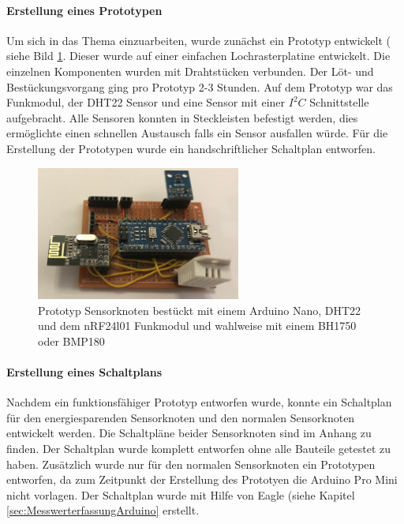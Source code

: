 \paragraph{Erstellung eines Prototypen} Um sich in das Thema einzuarbeiten, wurde zunächst ein Prototyp entwickelt ( siehe Bild \ref{img:prototyp}. Dieser wurde auf einer einfachen Lochrasterplatine entwickelt. Die einzelnen Komponenten wurden mit Drahtstücken verbunden. Der Löt- und Bestückungsvorgang ging pro Prototyp 2-3 Stunden. Auf dem Prototyp war das Funkmodul, der DHT22 Sensor und eine Sensor mit einer $I^2C$ Schnittstelle aufgebracht. Alle Sensoren konnten in Steckleisten befestigt werden, dies ermöglichte einen schnellen Austausch falls ein Sensor ausfallen würde. Für die Erstellung der Prototypen wurde ein handschriftlicher Schaltplan entworfen.
\begin{figure}
	\centering
	\includegraphics[width=0.6\textwidth]{bilder/prototyp}
	\caption[Prototyp Sensorknoten]{ Prototyp Sensorknoten bestückt mit einem Arduino Nano, DHT22 und dem nRF24l01 Funkmodul und wahlweise mit einem BH1750 oder BMP180}
	\label{img:prototyp}
\end{figure}

\paragraph{Erstellung eines Schaltplans} Nachdem ein funktionsfähiger Prototyp entworfen wurde, konnte ein Schaltplan für den energiesparenden Sensorknoten und den normalen Sensorknoten entwickelt werden. Die Schaltpläne beider Sensorknoten sind im Anhang zu finden. Der Schaltplan wurde komplett entworfen ohne alle Bauteile getestet zu haben. Zusätzlich wurde nur für den normalen Sensorknoten ein Prototypen entworfen, da zum Zeitpunkt der Erstellung des Prototyen die Arduino Pro Mini nicht vorlagen. Der Schaltplan wurde mit Hilfe von Eagle (siehe Kapitel \ref{sec:MesswerterfassungArduino} erstellt.
